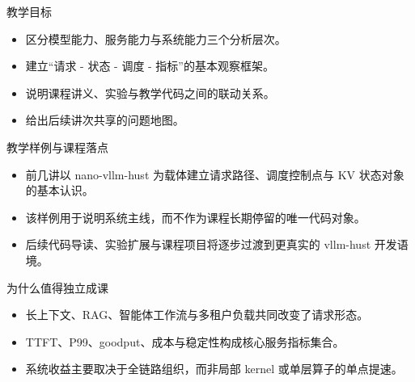 

\usepackage{tikz}
\usetikzlibrary{arrows.meta,positioning}




\begin{frame}[plain]
  \titlepage
\end{frame}

\begin{frame}{教学目标}
  \begin{itemize}
    \item 区分模型能力、服务能力与系统能力三个分析层次。
    \item 建立“请求 - 状态 - 调度 - 指标”的基本观察框架。
    \item 说明课程讲义、实验与教学代码之间的联动关系。
    \item 给出后续讲次共享的问题地图。
  \end{itemize}
\end{frame}

\begin{frame}{教学样例与课程落点}
  \begin{itemize}
    \item 前几讲以 nano-vllm-hust 为载体建立请求路径、调度控制点与 KV 状态对象的基本认识。
    \item 该样例用于说明系统主线，而不作为课程长期停留的唯一代码对象。
    \item 后续代码导读、实验扩展与课程项目将逐步过渡到更真实的 vllm-hust 开发语境。
  \end{itemize}
\end{frame}

\begin{frame}{为什么值得独立成课}
  \begin{itemize}
    \item 长上下文、RAG、智能体工作流与多租户负载共同改变了请求形态。
    \item TTFT、P99、goodput、成本与稳定性构成核心服务指标集合。
    \item 系统收益主要取决于全链路组织，而非局部 kernel 或单层算子的单点提速。
  \end{itemize}
\end{frame}

